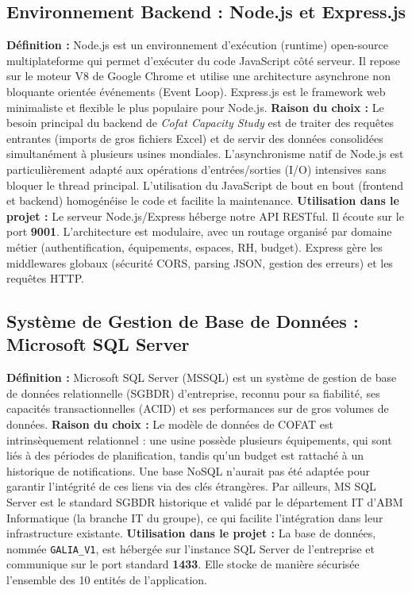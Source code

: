 \subsection{Environnement Backend : Node.js et Express.js}
\textbf{Définition :} Node.js est un environnement d'exécution (runtime) open-source multiplateforme qui permet d'exécuter du code JavaScript côté serveur. Il repose sur le moteur V8 de Google Chrome et utilise une architecture asynchrone non bloquante orientée événements (Event Loop). Express.js est le framework web minimaliste et flexible le plus populaire pour Node.js.
\newline
\textbf{Raison du choix :} Le besoin principal du backend de \textit{Cofat Capacity Study} est de traiter des requêtes entrantes (imports de gros fichiers Excel) et de servir des données consolidées simultanément à plusieurs usines mondiales. L'asynchronisme natif de Node.js est particulièrement adapté aux opérations d'entrées/sorties (I/O) intensives sans bloquer le thread principal. L'utilisation du JavaScript de bout en bout (frontend et backend) homogénéise le code et facilite la maintenance.
\newline
\textbf{Utilisation dans le projet :} Le serveur Node.js/Express héberge notre API RESTful. Il écoute sur le port \textbf{9001}. L'architecture est modulaire, avec un routage organisé par domaine métier (authentification, équipements, espaces, RH, budget). Express gère les middlewares globaux (sécurité CORS, parsing JSON, gestion des erreurs) et les requêtes HTTP.

\subsection{Système de Gestion de Base de Données : Microsoft SQL Server}
\textbf{Définition :} Microsoft SQL Server (MSSQL) est un système de gestion de base de données relationnelle (SGBDR) d'entreprise, reconnu pour sa fiabilité, ses capacités transactionnelles (ACID) et ses performances sur de gros volumes de données.
\newline
\textbf{Raison du choix :} Le modèle de données de COFAT est intrinsèquement relationnel : une usine possède plusieurs équipements, qui sont liés à des périodes de planification, tandis qu'un budget est rattaché à un historique de notifications. Une base NoSQL n'aurait pas été adaptée pour garantir l'intégrité de ces liens via des clés étrangères. Par ailleurs, MS SQL Server est le standard SGBDR historique et validé par le département IT d'ABM Informatique (la branche IT du groupe), ce qui facilite l'intégration dans leur infrastructure existante.
\newline
\textbf{Utilisation dans le projet :} La base de données, nommée \texttt{GALIA\_V1}, est hébergée sur l'instance SQL Server de l'entreprise et communique sur le port standard \textbf{1433}. Elle stocke de manière sécurisée l'ensemble des 10 entités de l'application.

